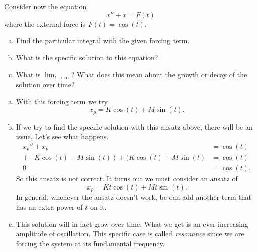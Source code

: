 \documentclass[12pt]{article} %
\begin{document}
\begin{problem}
Consider now the equation
\[
x''+x=F(t)
\]
where the external force is $F(t)=\cos(t)$.
\begin{enumerate}[(a)]
    \item Find the particular integral with the given forcing term.
    \item What is the specific solution to this equation?
    \item What is $\lim_{t\to \infty}$? What does this mean about the growth or decay of the solution over time?
\end{enumerate}
\end{problem}
\begin{solution}
\begin{enumerate}[(a)]
    \item With this forcing term we try 
    \[
    x_p = K \cos(t)+M\sin(t).
    \]
    \item If we try to find the specific solution with this ansatz above, there will be an issue.  Let's see what happens.  
    \begin{align*}
        x_p''+x_p &= \cos(t)\\
        (-K\cos(t)-M\sin(t))+(K\cos(t)+M\sin(t)&=\cos(t)\\
        0&=\cos(t).
    \end{align*}
    So this ansatz is not correct.  It turns out we must consider an ansatz of
    \[
    x_p=Kt\cos(t)+Mt\sin(t).
    \]
    In general, whenever the ansatz doesn't work, be can add another term that has an extra power of $t$ on it.
    \item This solution will in fact grow over time.  What we get is an ever increasing amplitude of oscillation. This specific case is called \emph{resonance} since we are forcing the system at its fundamental frequency.
\end{enumerate}
\end{solution}

\newpage
\end{document}
